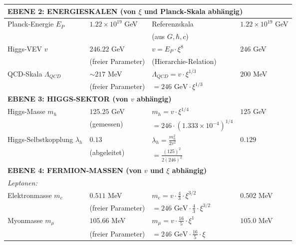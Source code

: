 \documentclass[12pt,a4paper]{article}
\theoremstyle{definition}
\begin{document}
\begin{longtable}{p{5cm}p{4cm}p{3.5cm}p{3.5cm}}
	\midrule
	\multicolumn{4}{l}{\textbf{EBENE 2: ENERGIESKALEN (von $\xi$ und Planck-Skala abhängig)}} \\
	\midrule
	
	Planck-Energie $E_P$ & $1.22 \times 10^{19}$ GeV & Referenzskala & $1.22 \times 10^{19}$ GeV \\
	& & (aus $G, \hbar, c$) & \\[0.3em]
	
	Higgs-VEV $v$ & $246.22$ GeV & $v = E_P \cdot \xi^{8}$ & $246$ GeV \\
	& (freier Parameter) & (Hierarchie-Relation) & \\[0.3em]
	
	QCD-Skala $\Lambda_{QCD}$ & $\sim 217$ MeV & $\Lambda_{QCD} = v \cdot \xi^{1/3}$ & $200$ MeV \\
	& (freier Parameter) & $= 246 \text{ GeV} \cdot \xi^{1/3}$ & \\[0.3em]
	
	\midrule
	\multicolumn{4}{l}{\textbf{EBENE 3: HIGGS-SEKTOR (von $v$ abhängig)}} \\
	\midrule
	
	Higgs-Masse $m_h$ & $125.25$ GeV & $m_h = v \cdot \xi^{1/4}$ & $125$ GeV \\
	& (gemessen) & $= 246 \cdot (1.333 \times 10^{-4})^{1/4}$ & \\[0.3em]
	
	Higgs-Selbstkopplung $\lambda_h$ & $0.13$ & $\lambda_h = \frac{m_h^2}{2v^2}$ & $0.129$ \\
	& (abgeleitet) & $= \frac{(125)^2}{2(246)^2}$ & \\[0.3em]
	
	\midrule
	\multicolumn{4}{l}{\textbf{EBENE 4: FERMION-MASSEN (von $v$ und $\xi$ abhängig)}} \\
	\midrule
	
	\multicolumn{4}{l}{\textit{Leptonen:}} \\
	
	Elektronmasse $m_e$ & $0.511$ MeV & $m_e = v \cdot \frac{4}{3} \cdot \xi^{3/2}$ & $0.502$ MeV \\
	& (freier Parameter) & $= 246 \text{ GeV} \cdot \frac{4}{3} \cdot \xi^{3/2}$ & \\[0.3em]
	
	Myonmasse $m_\mu$ & $105.66$ MeV & $m_\mu = v \cdot \frac{16}{5} \cdot \xi^1$ & $105.0$ MeV \\
	& (freier Parameter) & $= 246 \text{ GeV} \cdot \frac{16}{5} \cdot \xi$ & \\[0.3em]
	

\end{longtable}
\end{document}

